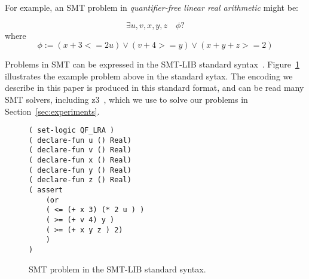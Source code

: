 For example, an SMT problem in \textit{quantifier-free linear real arithmetic} might be:

$$
\exists u,v,x,y,z\quad\phi?
$$
where
$$
\phi:= (x+3 <= 2u) \vee (v+4 >= y) \vee (x+y+z >= 2)
$$

Problems in SMT can be expressed in the SMT-LIB standard syntax~\cite{bar10}. Figure~\ref{fig:smtlib} illustrates the example problem above in the standard sytax. The encoding we describe in this paper is produced in this standard format, and can be read many SMT solvers, including {\sc z3}~\cite{dem08}, which we use to solve our problems in Section~\ref{sec:experiments}. 

\begin{figure}[htb]
\centering
\begin{BVerbatim}
( set-logic QF_LRA )
( declare-fun u () Real)
( declare-fun v () Real)
( declare-fun x () Real)
( declare-fun y () Real)
( declare-fun z () Real)
( assert
    (or
    ( <= (+ x 3) (* 2 u ) )
    ( >= (+ v 4) y )
    ( >= (+ x y z ) 2)
    )
)
\end{BVerbatim}
\caption{SMT problem in the SMT-LIB standard syntax.}
\label{fig:smtlib}
\end{figure}
